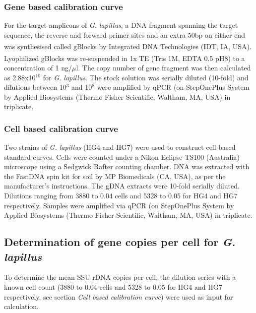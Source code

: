 \documentclass[12pt]{article}
\begin{document}
\subsubsection*{Gene based calibration curve}
For the target amplicons of \emph{G. lapillus}, a DNA fragment spanning the target sequence, the reverse and forward primer sites and an extra 50bp on either end was synthesised called gBlocks \textsuperscript{\textregistered} by Integrated DNA Technologies (IDT, IA, USA). %
Lyophilized gBlocks \textsuperscript{\textregistered} was re-suspended in 1x TE (Tris 1M, EDTA 0.5 pH8) to a concentration of 1 ng/$\mu$l. 
The copy number of gene fragment was then calculated as 2.88x10$^{10}$ 
for \textit{G. lapillus}. 
The stock solution was serially diluted (10-fold) and dilutions between 10$^{3}$ and 10$^{8}$ were amplified by qPCR 
(on StepOnePlus System by Applied Biosystems (Thermo Fisher Scientific, Waltham, MA, USA) in triplicate.


\subsubsection*{Cell based calibration curve}
Two strains of \emph{G. lapillus} (HG4 and HG7) 
were used to construct cell based standard curves. 
Cells were counted under a Nikon Eclipse TS100 (Australia) microscope using a Sedgwick Rafter counting chamber. 
DNA was extracted with the FastDNA spin kit for soil by MP Biomedicals (CA, USA), as per the manufacturer's instructions. 
The gDNA extracts were 10-fold serially diluted. 
Dilutions ranging from 3880 to 0.04 cells and 5328 to 0.05 for HG4 and HG7 respectively.  
Samples were amplified via qPCR (on StepOnePlus System by Applied Biosystems (Thermo Fisher Scientific, Waltham, MA, USA) %
in triplicate.

\subsection*{Determination of gene copies per cell for \emph{G. lapillus}}
 To determine the mean SSU rDNA copies per cell, the dilution series with a known cell count (3880 to 0.04 cells and 5328 to 0.05 for HG4 and HG7 respectively, see section \textit{Cell based calibration curve}) were used as input for calculation. 
\end{document}
